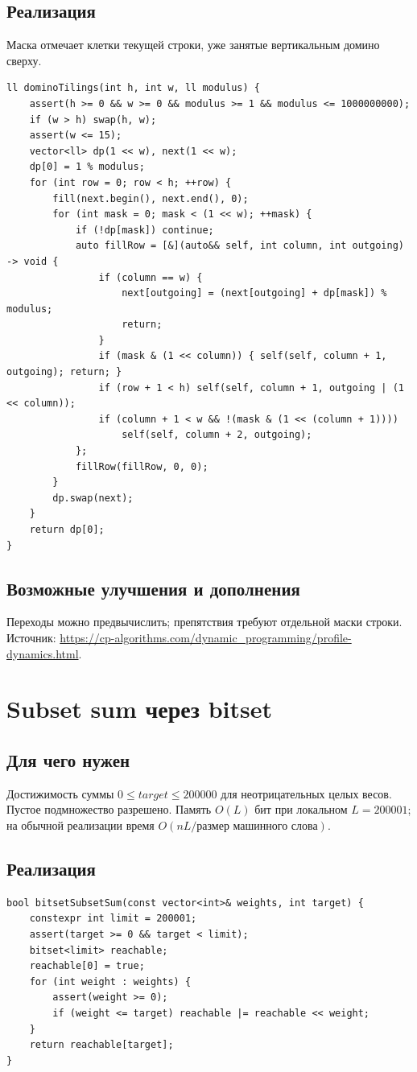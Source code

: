 \subsection*{Реализация}
Маска отмечает клетки текущей строки, уже занятые вертикальным домино сверху.
\begin{lstlisting}[name=optimization_domino]
ll dominoTilings(int h, int w, ll modulus) {
    assert(h >= 0 && w >= 0 && modulus >= 1 && modulus <= 1000000000);
    if (w > h) swap(h, w);
    assert(w <= 15);
    vector<ll> dp(1 << w), next(1 << w);
    dp[0] = 1 % modulus;
    for (int row = 0; row < h; ++row) {
        fill(next.begin(), next.end(), 0);
        for (int mask = 0; mask < (1 << w); ++mask) {
            if (!dp[mask]) continue;
            auto fillRow = [&](auto&& self, int column, int outgoing) -> void {
                if (column == w) {
                    next[outgoing] = (next[outgoing] + dp[mask]) % modulus;
                    return;
                }
                if (mask & (1 << column)) { self(self, column + 1, outgoing); return; }
                if (row + 1 < h) self(self, column + 1, outgoing | (1 << column));
                if (column + 1 < w && !(mask & (1 << (column + 1))))
                    self(self, column + 2, outgoing);
            };
            fillRow(fillRow, 0, 0);
        }
        dp.swap(next);
    }
    return dp[0];
}
\end{lstlisting}
\subsection*{Возможные улучшения и дополнения}
Переходы можно предвычислить; препятствия требуют отдельной маски строки.
Источник: \url{https://cp-algorithms.com/dynamic_programming/profile-dynamics.html}.


\fi
\iffalse
\section{Subset sum через bitset}
\subsection*{Для чего нужен}
Достижимость суммы $0\le target\le200000$ для неотрицательных целых весов.
Пустое подмножество разрешено. Память $O(L)$ бит при локальном $L=200001$;
на обычной реализации время $O(nL/\text{размер машинного слова})$.
\subsection*{Реализация}
\begin{lstlisting}[name=optimization_bitset]
bool bitsetSubsetSum(const vector<int>& weights, int target) {
    constexpr int limit = 200001;
    assert(target >= 0 && target < limit);
    bitset<limit> reachable;
    reachable[0] = true;
    for (int weight : weights) {
        assert(weight >= 0);
        if (weight <= target) reachable |= reachable << weight;
    }
    return reachable[target];
}
\end{lstlisting}
